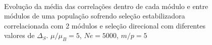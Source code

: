 \begin{center}
\begin{figure}[htbp]
      \vspace{-18pt}
      \vspace{11pt}
      \\
      \caption{ Evolução da média das correlações dentro de cada módulo
      e entre módulos de uma população sofrendo seleção estabilizadora
      correlacionada com 2 módulos e seleção direcional com diferentes
      valores de $\Delta_S$. $\mu/\mu_B = 5$, $Ne = 5000$, $m/p=5$}
      \label{AVGEntreIntra}
   \end{figure}
\end{center}

